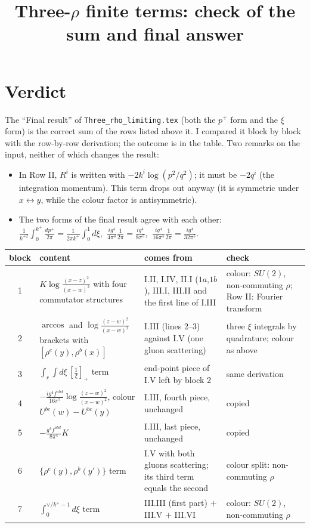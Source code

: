 \documentclass[10pt]{article}
\title{Three-$\rho$ finite terms: check of the sum and final answer}
\author{}
\date{}
\numberwithin{equation}{section}
\begin{document}
\maketitle
\tableofcontents

\section{Verdict}

The ``Final result'' of \texttt{Three\_rho\_limiting.tex} (both the $p^{+}$ form and the $\xi$ form) is the correct sum of the rows listed above it. I compared it block by block with the row-by-row derivation; the outcome is in the table. Two remarks on the input, neither of which changes the result:
\begin{itemize}
\item In Row II, $R^{i}$ is written with $-2k^{i}\log(p^{2}/q^{2})$; it must be $-2q^{i}$ (the integration momentum). This term drops out anyway (it is symmetric under $x\leftrightarrow y$, while the colour factor is antisymmetric).
\item The two forms of the final result agree with each other: $\frac{1}{k^{+2}}\int_{0}^{k^{+}}\frac{dp^{+}}{2\pi}=\frac{1}{2\pi k^{+}}\int_{0}^{1}d\xi$, $\ \frac{ig^{4}}{4\pi^{4}}\frac{1}{2\pi}=\frac{ig^{4}}{8\pi^{5}}$, $\ \frac{ig^{4}}{16\pi^{4}}\frac{1}{2\pi}=\frac{ig^{4}}{32\pi^{5}}$.
\end{itemize}

\begin{center}
\renewcommand{\arraystretch}{1.3}
\begin{tabular}{c|p{6.2cm}|p{5.6cm}|p{3.2cm}}
block & content & comes from & check\\ \hline
1 & $K\log\frac{(x-z)^{2}}{(x-w)^{2}}$ with four commutator structures & I.II, I.IV, II.I ($1a$,$1b$), III.I, III.II and the first line of I.III & colour: $SU(2)$, non-commuting $\rho$; Row II: Fourier transform\\
2 & $\arccos$ and $\log\frac{(z-w)^{2}}{(x-w)^{2}}$ brackets with $[\rho^{e}(y),\rho^{b}(x)]$ & I.III (lines 2--3) against I.V (one gluon scattering) & three $\xi$ integrals by quadrature; colour as above\\
3 & $\int_{r}\int d\xi\,[\frac1\xi]_{+}$ term & end-point piece of I.V left by block 2 & same derivation\\
4 & $-\frac{ig^{4}f^{abd}}{16\pi^{5}}\log\frac{(z-w)^{2}}{(x-w)^{2}}$, colour $U^{bc}(w)-U^{bc}(y)$ & I.III, fourth piece, unchanged & copied\\
5 & $-\frac{g^{4}f^{abd}}{8\pi^{4}}K$ & I.III, last piece, unchanged & copied\\
6 & $\{\rho^{e}(y),\rho^{b}(y')\}$ term & I.V with both gluons scattering; its third term equals the second & colour split: non-commuting $\rho$\\
7 & $\int_{0}^{\vee/k^{+}-1}d\xi$ term & III.III (first part) $+$ III.V $+$ III.VI & colour: $SU(2)$, non-commuting $\rho$
\end{tabular}
\end{center}
\end{document}

